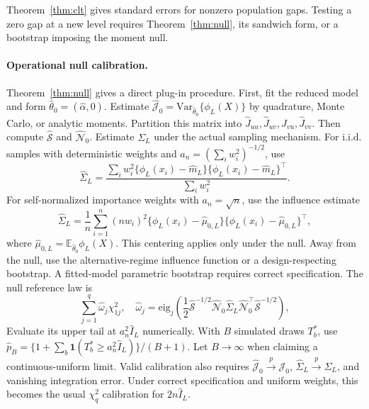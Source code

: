 \documentclass[twoside]{article}
\theoremstyle{definition}
\theoremstyle{remark}
\newcommand{\E}{\mathbb E}
\begin{document}
Theorem~\ref{thm:clt} gives standard errors for nonzero population gaps. Testing a zero gap at a new level requires Theorem~\ref{thm:null}, its sandwich form, or a bootstrap imposing the moment null.

\paragraph{Operational null calibration.}
Theorem~\ref{thm:null} gives a direct plug-in procedure. First, fit the reduced model and form $\widehat\theta_0=(\widehat\alpha,0)$. Estimate
$
  \widehat{\mathcal J}_0=\mathrm{Var}_{\widehat\theta_0}\{\phi_L(X)\}
$
by quadrature, Monte Carlo, or analytic moments. Partition this matrix into $\widehat J_{uu},\widehat J_{uv},\widehat J_{vu},\widehat J_{vv}$. Then compute $\widehat{\mathcal S}$ and $\widehat{\mathcal N}_0$. Estimate $\Sigma_L$ under the actual sampling mechanism. For i.i.d. samples with deterministic weights and $a_n=(\sum_iw_i^2)^{-1/2}$, use
\[
  \widehat\Sigma_L=\frac{\sum_iw_i^2\{\phi_L(x_i)-\widehat m_L\}\{\phi_L(x_i)-\widehat m_L\}^\top}{\sum_iw_i^2}.
\]
For self-normalized importance weights with $a_n=\sqrt n$, use the influence estimate
\[
  \widehat\Sigma_L=\frac1n\sum_{i=1}^n (nw_i)^2
  \{\phi_L(x_i)-\widehat\mu_{0,L}\}\{\phi_L(x_i)-\widehat\mu_{0,L}\}^\top,
\]
where $\widehat\mu_{0,L}=\E_{\widehat\theta_0}\phi_L(X)$. This centering applies only under the null. Away from the null, use the alternative-regime influence function or a design-respecting bootstrap. A fitted-model parametric bootstrap requires correct specification. The null reference law is
\begin{equation}
  \sum_{j=1}^q \widehat\omega_j\chi^2_{1j},
  \quad
  \widehat\omega_j=\mathrm{eig}_j\left(\frac12\widehat{\mathcal S}^{-1/2}\widehat{\mathcal N}_0\widehat\Sigma_L\widehat{\mathcal N}_0^\top\widehat{\mathcal S}^{-1/2}\right),
  \label{eq:weighted_chisq_sim}
\end{equation}
Evaluate its upper tail at $a_n^2\widehat I_L$ numerically. With $B$ simulated draws $T_b^*$, use $\widehat p_B=\{1+\sum_b\mathbf1(T_b^*\ge a_n^2\widehat I_L)\}/(B+1)$. Let $B\to\infty$ when claiming a continuous-uniform limit. Valid calibration also requires $\widehat{\mathcal J}_0\xrightarrow{p}\mathcal J_0$, $\widehat\Sigma_L\xrightarrow{p}\Sigma_L$, and vanishing integration error. Under correct specification and uniform weights, this becomes the usual $\chi_q^2$ calibration for $2n\widehat I_L$.
\end{document}
